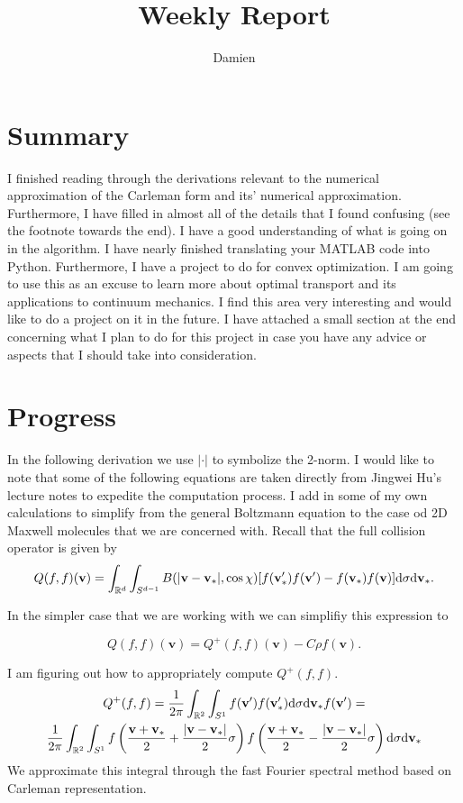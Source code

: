 \documentclass{article}
\title{Weekly Report}
\author{Damien}
\def\t{\text}
\def\b{\mathbf}
\begin{document}
\maketitle
\section{Summary}

I finished reading through the derivations relevant to the numerical approximation of the Carleman form and its' numerical approximation. Furthermore, I have filled in almost all of the details that I found confusing (see the footnote towards the end). I have a good understanding of what is going on in the algorithm. I have nearly finished translating your MATLAB code into Python. Furthermore, I have a project to do for convex optimization. I am going to use this as an excuse to learn more about optimal transport and its applications to continuum mechanics. I find this area very interesting and would like to do a project on it in the future. I have attached a small section at the end concerning what I plan to do for this project in case you have any advice or aspects that I should take into consideration. 

\section{Progress}
In the following derivation we use $|\cdot|$ to symbolize the 2-norm. I would like to note that some of the following equations are taken directly from Jingwei Hu's lecture notes to expedite the computation process. I add in some of my own calculations to simplify from the general Boltzmann equation to the case od 2D Maxwell molecules that we are concerned with. Recall that the full collision operator is given by
\begin{equation} \label{eq:collision}
    Q(f,f)(\b v) = \int_{\mathbb{R}^d} \int_{S^{d-1}} B(|\b v - \b v_*|,\cos \chi)[f(\b v_*') f(\b v') - f(\b v_*) f(\b v)] \t d \sigma \t d \b v_*.
\end{equation}

In the simpler case that we are working with we can simplifiy this expression to

\[
    Q(f,f)(\b v) = Q^+(f,f)(\b v) - C \rho f(\b v).
\]

I am figuring out how to appropriately compute $Q^+(f,f)$.
\begin{gather*}
    Q^+(f,f) = \frac{1}{2 \pi} \int_{\mathbb{R}^2} \int_{S^1} f(\b v') f(\b v'_*) \t d \sigma \t d \b v_*f(\b v') = \\
    \frac{1}{2 \pi} \int_{\mathbb{R}^2} \int_{S^1} f \left(\frac{\b v + \b v_*}{2} + \frac{|\b v - \b v_*| }{2} \sigma \right) f \left(\frac{\b v + \b v_*}{2} - \frac{|\b v - \b v_*| }{2} \sigma \right)\t d \sigma \t d \b v_*
\end{gather*}
We approximate this integral through the fast Fourier spectral method based on Carleman representation.
\end{document}
